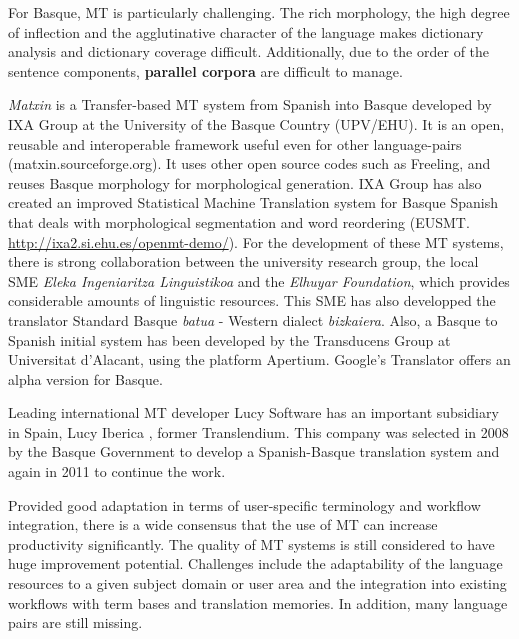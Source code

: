 \begin{multicols}{2}
For Basque, MT is particularly challenging. The rich morphology, the high degree of inflection and the agglutinative character of the language makes dictionary analysis and dictionary coverage difficult. Additionally, due to the order of the sentence components, \textbf{parallel corpora} are difficult to manage. 

\textit{Matxin} is a Transfer-based MT system from Spanish into Basque developed by IXA Group at the University of the Basque Country (UPV/EHU). It is an open, reusable and interoperable framework useful even for other language-pairs (matxin.sourceforge.org). It uses other open source codes such as Freeling, and reuses Basque morphology for morphological generation. IXA Group has also created an improved Statistical Machine Translation system for Basque Spanish that deals with morphological segmentation and word reordering (EUSMT. \url{http://ixa2.si.ehu.es/openmt-demo/}).  For the development of these MT systems, there is strong collaboration between the university research group, the local SME \textit{Eleka Ingeniaritza Linguistikoa} and the \textit{Elhuyar Foundation}, which provides considerable amounts of linguistic resources. This SME has also developped the translator Standard Basque \textit{batua} - Western dialect \textit{bizkaiera}. Also, a Basque to Spanish initial system has been developed by the Transducens Group at Universitat d’Alacant, using the platform Apertium.  Google's Translator offers an alpha version for Basque.

Leading international MT developer Lucy Software has an important subsidiary in Spain, Lucy Iberica \cite{BAS-Nota35}, former Trans\-len\-dium. This company was selected in 2008 by the Basque Government to develop a Spanish-Basque translation system and again in 2011 to continue the work. 

Provided good adaptation in terms of user-specific terminology and workflow integration, there is a wide consensus that the use of MT can increase productivity significantly. The quality of MT systems is still considered to have huge improvement potential. Challenges include the adaptability of the language resources to a given subject domain or user area and the integration into existing workflows with term bases and translation memories. In addition, many language pairs are still missing.


\end{multicols}
